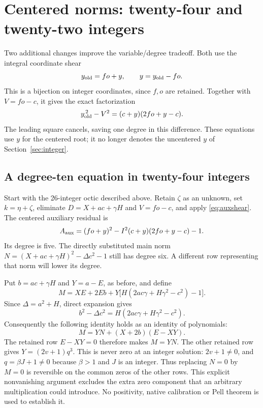 \section{Centered norms: twenty-four and twenty-two integers}
\label{sec:centered}

Two additional changes improve the variable/degree tradeoff. Both use the
integral coordinate shear
\begin{equation}
 y_{\rm old}=fo+y,\qquad y=y_{\rm old}-fo.
 \label{eq:auxshear}
\end{equation}
This is a bijection on integer coordinates, since $f,o$ are retained.
Together with $V=fo-c$, it gives the exact factorization
\begin{equation}
 y_{\rm old}^{\,2}-V^2=(c+y)(2fo+y-c).
 \label{eq:auxdiff}
\end{equation}
The leading square cancels, saving one degree in this difference.
These equations use $y$ for the centered root; it no longer denotes
the uncentered $y$ of Section~\ref{sec:integer}.

\subsection{A degree-ten equation in twenty-four integers}

Start with the 26-integer octic described above. Retain $\zeta$ as an
unknown, set $k=\eta+\zeta$, eliminate $D=X+ac+\gamma H$ and $V=fo-c$,
and apply \eqref{eq:auxshear}. The centered auxiliary residual is
\begin{equation}
 A_{\rm aux}=(fo+y)^2-I^2(c+y)(2fo+y-c)-1.
 \label{eq:aux24}
\end{equation}
Its degree is five. The directly substituted main norm
$N=(X+ac+\gamma H)^2-\Delta c^2-1$ still has degree six. A different
row representing that norm will lower its degree.

Put $b=ac+\gamma H$ and $Y=a-E$, as before, and define
\begin{equation}
 M=XE+2Eb+Y\bigl[H(2ac\gamma+H\gamma^2-c^2)-1\bigr].
 \label{eq:main24}
\end{equation}
Since $\Delta=a^2+H$, direct expansion gives
\[
 b^2-\Delta c^2=H(2ac\gamma+H\gamma^2-c^2).
\]
Consequently the following identity holds as an identity of polynomials:
\begin{equation}
 \boxed{M=YN+(X+2b)(E-XY).}
 \label{eq:nonzeroscale}
\end{equation}
The retained row $E-XY=0$ therefore makes $M=YN$. The other retained
row gives $Y=(2v+1)q^3$. This is never zero at an integer solution:
$2v+1\ne0$, and $q=\beta J+1\ne0$ because $\beta>1$ and $J$ is an
integer. Thus replacing $N=0$ by $M=0$ is reversible on the common
zeros of the other rows. This explicit nonvanishing argument excludes
the extra zero component that an arbitrary multiplication could introduce.
No positivity, native calibration or Pell theorem is used to establish it.

